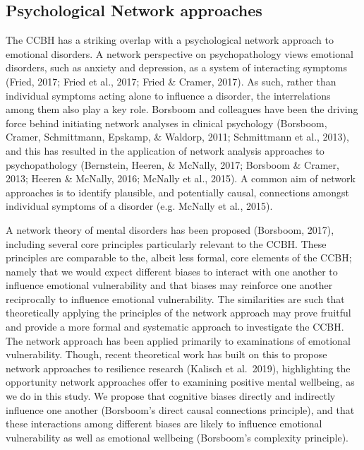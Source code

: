 \documentclass[
  english,
  man]{apa6}
\begin{document}
\hypertarget{psychological-network-approaches}{%
\subsection{Psychological Network approaches}\label{psychological-network-approaches}}

The CCBH has a striking overlap with a psychological network approach to emotional disorders. A network perspective on psychopathology views emotional disorders, such as anxiety and depression, as a system of interacting symptoms (Fried, 2017; Fried et al., 2017; Fried \& Cramer, 2017). As such, rather than individual symptoms acting alone to influence a disorder, the interrelations among them also play a key role. Borsboom and colleagues have been the driving force behind initiating network analyses in clinical psychology (Borsboom, Cramer, Schmittmann, Epskamp, \& Waldorp, 2011; Schmittmann et al., 2013), and this has resulted in the application of network analysis approaches to psychopathology (Bernstein, Heeren, \& McNally, 2017; Borsboom \& Cramer, 2013; Heeren \& McNally, 2016; McNally et al., 2015). A common aim of network approaches is to identify plausible, and potentially causal, connections amongst individual symptoms of a disorder (e.g. McNally et al., 2015).

A network theory of mental disorders has been proposed (Borsboom, 2017), including several core principles particularly relevant to the CCBH. These principles are comparable to the, albeit less formal, core elements of the CCBH; namely that we would expect different biases to interact with one another to influence emotional vulnerability and that biases may reinforce one another reciprocally to influence emotional vulnerability. The similarities are such that theoretically applying the principles of the network approach may prove fruitful and provide a more formal and systematic approach to investigate the CCBH. The network approach has been applied primarily to examinations of emotional vulnerability. Though, recent theoretical work has built on this to propose network approaches to resilience research (Kalisch et al.~2019), highlighting the opportunity network approaches offer to examining positive mental wellbeing, as we do in this study. We propose that cognitive biases directly and indirectly influence one another (Borsboom's direct causal connections principle), and that these interactions among different biases are likely to influence emotional vulnerability as well as emotional wellbeing (Borsboom's complexity principle).
\end{document}

